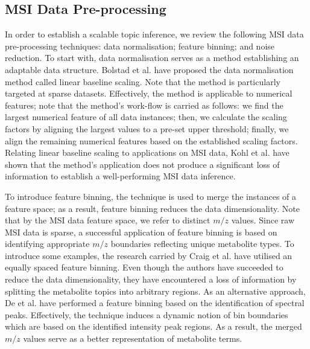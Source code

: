 \documentclass{mpaper}
\begin{document}
\subsection{MSI Data Pre-processing}


\par In order to establish a scalable topic inference, we review the following MSI data pre-processing techniques: data normalisation; feature binning; and noise reduction. To start with, data normalisation serves as a method establishing an adaptable data structure. Bolstad et al. \cite{bolstad2003comparison} have proposed the data normalisation method called linear baseline scaling. Note that the method is particularly targeted at sparse datasets. Effectively, the method is applicable to numerical features; note that the method's work-flow is carried as follows: we find the largest numerical feature of all data instances; then, we calculate the scaling factors by aligning the largest values to a pre-set upper threshold; finally, we align the remaining numerical features based on the established scaling factors. Relating linear baseline scaling to applications on MSI data, Kohl et al. \cite{kohl2012state} have shown that the method's application does not produce a significant loss of information to establish a well-performing MSI data inference. 

\par To introduce feature binning, the technique is used to merge the instances of a feature space; as a result, feature binning reduces the data dimensionality. Note that by the MSI data feature space, we refer to distinct $m/z$ values. Since raw MSI data is sparse, a successful application of feature binning is based on identifying appropriate $m/z$ boundaries reflecting unique metabolite types. To introduce some examples, the research carried by Craig et al. \cite{craig2006scaling} have utilised an equally spaced feature binning. Even though the authors have succeeded to reduce the data dimensionality, they have encountered a loss of information by splitting the metabolite topics into arbitrary regions. As an alternative approach, De et al. \cite{de2008nmr} have performed a feature binning based on the identification of spectral peaks. Effectively, the technique induces a dynamic notion of bin boundaries which are based on the identified intensity peak regions. As a result, the merged $m/z$ values serve as a better representation of metabolite terms.
\end{document}
